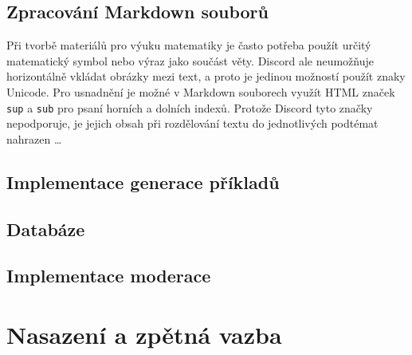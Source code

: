 \documentclass[FM]{tulthesis}
\begin{document}
	
	\subsection{Zpracování Markdown souborů}
	
	Při tvorbě materiálů pro výuku matematiky je často potřeba použít určitý matematický symbol nebo výraz jako součást věty. Discord ale neumožňuje horizontálně vkládat obrázky mezi text, a proto je jedinou možností použít znaky Unicode. Pro usnadnění je možné v Markdown souborech využít HTML značek \verb*|sup| a \verb*|sub| pro psaní horních a dolních indexů. Protože Discord tyto značky nepodporuje, je jejich obsah při rozdělování textu do jednotlivých podtémat nahrazen \dots
	

	\subsection{Implementace generace příkladů}
	
	\subsection{Databáze}
	
	\subsection{Implementace moderace}


	
	\section{Nasazení a zpětná vazba}
	
\end{document}
